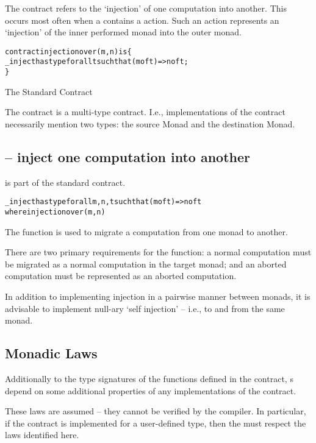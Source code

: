 The  contract refers to the `injection' of one computation into another. This occurs most often when a  contains a  action. Such an action represents an `injection' of the inner performed monad into the outer monad.

\begin{program}
\begin{alltt}
contract injection over (m,n) is \{
  \_inject has type for all t such that (m of t)=>n of t;
\}
\end{alltt}
\caption{The Standard  Contract\label{injectionContractProg}}
\end{program}

The  contract is a multi-type contract. I.e., implementations of the  contract necessarily mention two types: the source Monad and the destination Monad. 

\subsection{ -- inject one computation into another}
\label{injectFunction}
 is part of the standard  contract.
\begin{alltt}
\_inject has type for all m,n,t such that (m of t)=>n of t
                  where injection over (m,n)
\end{alltt}
The  function is used to migrate a computation from one monad to another. 

There are two primary requirements for the  function: a normal computation must be migrated as a normal computation in the target monad; and an aborted computation must be represented as an aborted computation. 

In addition to implementing injection in a pairwise manner between monads, it is advisable to implement null-ary `self injection' -- i.e., to and from the same monad.

\subsection{Monadic Laws}
\label{monadicAxioms}
Additionally to the type signatures of the functions defined in the  contract, s depend on some additional properties of any implementations of the contract.
\begin{aside}
These laws are assumed -- they cannot be verified by the compiler. In particular, if the  contract is implemented for a user-defined type, then the  must respect the laws identified here.
\end{aside}


